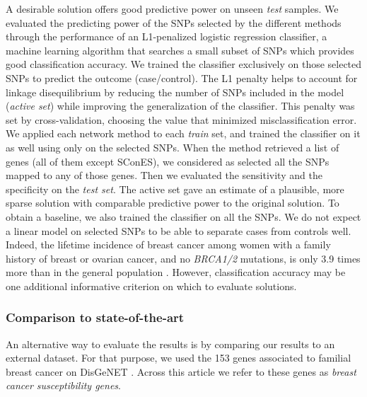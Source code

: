 \documentclass[10pt,letterpaper]{article}
\begin{document}
A desirable solution offers good predictive power on unseen \emph{test} samples. We evaluated the predicting power of the SNPs selected by the different methods through the performance of an L1-penalized logistic regression classifier, a machine learning algorithm that searches a small subset of SNPs which provides good classification accuracy. We trained the classifier exclusively on those selected SNPs to predict the outcome (case/control). The L1 penalty helps to account for linkage disequilibrium by reducing the number of SNPs included in the model (\emph{active set}) while improving the generalization of the classifier. This penalty was set by cross-validation, choosing the value that minimized misclassification error. We applied each network method to each \emph{train} set, and trained the classifier on it as well using only on the selected SNPs. When the method retrieved a list of genes (all of them except SConES), we considered as selected all the SNPs mapped to any of those genes. Then we evaluated the sensitivity and the specificity on the \emph{test set}. The active set gave an estimate of a plausible, more sparse solution with comparable predictive power to the original solution. To obtain a baseline, we also trained the classifier on all the SNPs. We do not expect a linear model on selected SNPs to be able to separate cases from controls well. Indeed, the lifetime incidence of breast cancer among women with a family history of breast or ovarian cancer, and no \emph{BRCA1/2} mutations, is only 3.9 times more than in the general population \cite{Metcalfe2008}. However, classification accuracy may be one additional informative criterion on which to evaluate solutions.

\subsubsection{Comparison to state-of-the-art}
\label{methods:bcac}

An alternative way to evaluate the results is by comparing our results to an external dataset. For that purpose, we used the 153 genes associated to familial breast cancer on DisGeNET \cite{pinero_disgenet:_2017}. Across this article we refer to these genes as \emph{breast cancer susceptibility genes}.
\end{document}
